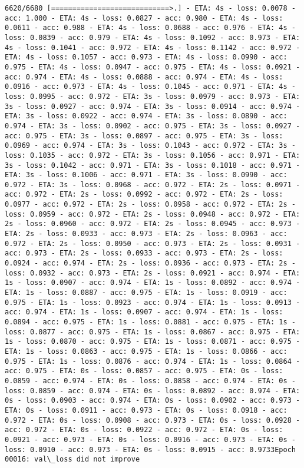 \documentclass[11pt]{article}
\begin{document}
\begin{Verbatim}[commandchars=\\\{\}]
6620/6680 [============================>.] - ETA: 4s - loss: 0.0078 - acc: 1.000 - ETA: 4s - loss: 0.0827 - acc: 0.980 - ETA: 4s - loss: 0.0611 - acc: 0.988 - ETA: 4s - loss: 0.0688 - acc: 0.976 - ETA: 4s - loss: 0.0839 - acc: 0.979 - ETA: 4s - loss: 0.1092 - acc: 0.973 - ETA: 4s - loss: 0.1041 - acc: 0.972 - ETA: 4s - loss: 0.1142 - acc: 0.972 - ETA: 4s - loss: 0.1057 - acc: 0.973 - ETA: 4s - loss: 0.0990 - acc: 0.975 - ETA: 4s - loss: 0.0947 - acc: 0.975 - ETA: 4s - loss: 0.0921 - acc: 0.974 - ETA: 4s - loss: 0.0888 - acc: 0.974 - ETA: 4s - loss: 0.0916 - acc: 0.973 - ETA: 4s - loss: 0.1045 - acc: 0.971 - ETA: 4s - loss: 0.0995 - acc: 0.972 - ETA: 3s - loss: 0.0979 - acc: 0.973 - ETA: 3s - loss: 0.0927 - acc: 0.974 - ETA: 3s - loss: 0.0914 - acc: 0.974 - ETA: 3s - loss: 0.0922 - acc: 0.974 - ETA: 3s - loss: 0.0890 - acc: 0.974 - ETA: 3s - loss: 0.0902 - acc: 0.975 - ETA: 3s - loss: 0.0927 - acc: 0.975 - ETA: 3s - loss: 0.0897 - acc: 0.975 - ETA: 3s - loss: 0.0969 - acc: 0.974 - ETA: 3s - loss: 0.1043 - acc: 0.972 - ETA: 3s - loss: 0.1035 - acc: 0.972 - ETA: 3s - loss: 0.1056 - acc: 0.971 - ETA: 3s - loss: 0.1042 - acc: 0.971 - ETA: 3s - loss: 0.1018 - acc: 0.971 - ETA: 3s - loss: 0.1006 - acc: 0.971 - ETA: 3s - loss: 0.0990 - acc: 0.972 - ETA: 3s - loss: 0.0968 - acc: 0.972 - ETA: 2s - loss: 0.0971 - acc: 0.972 - ETA: 2s - loss: 0.0992 - acc: 0.972 - ETA: 2s - loss: 0.0977 - acc: 0.972 - ETA: 2s - loss: 0.0958 - acc: 0.972 - ETA: 2s - loss: 0.0959 - acc: 0.972 - ETA: 2s - loss: 0.0948 - acc: 0.972 - ETA: 2s - loss: 0.0960 - acc: 0.972 - ETA: 2s - loss: 0.0945 - acc: 0.973 - ETA: 2s - loss: 0.0933 - acc: 0.973 - ETA: 2s - loss: 0.0963 - acc: 0.972 - ETA: 2s - loss: 0.0950 - acc: 0.973 - ETA: 2s - loss: 0.0931 - acc: 0.973 - ETA: 2s - loss: 0.0933 - acc: 0.973 - ETA: 2s - loss: 0.0924 - acc: 0.974 - ETA: 2s - loss: 0.0936 - acc: 0.973 - ETA: 2s - loss: 0.0932 - acc: 0.973 - ETA: 2s - loss: 0.0921 - acc: 0.974 - ETA: 1s - loss: 0.0907 - acc: 0.974 - ETA: 1s - loss: 0.0892 - acc: 0.974 - ETA: 1s - loss: 0.0887 - acc: 0.975 - ETA: 1s - loss: 0.0919 - acc: 0.975 - ETA: 1s - loss: 0.0923 - acc: 0.974 - ETA: 1s - loss: 0.0913 - acc: 0.974 - ETA: 1s - loss: 0.0907 - acc: 0.974 - ETA: 1s - loss: 0.0894 - acc: 0.975 - ETA: 1s - loss: 0.0881 - acc: 0.975 - ETA: 1s - loss: 0.0877 - acc: 0.975 - ETA: 1s - loss: 0.0867 - acc: 0.975 - ETA: 1s - loss: 0.0870 - acc: 0.975 - ETA: 1s - loss: 0.0871 - acc: 0.975 - ETA: 1s - loss: 0.0863 - acc: 0.975 - ETA: 1s - loss: 0.0866 - acc: 0.975 - ETA: 1s - loss: 0.0876 - acc: 0.974 - ETA: 1s - loss: 0.0864 - acc: 0.975 - ETA: 0s - loss: 0.0857 - acc: 0.975 - ETA: 0s - loss: 0.0859 - acc: 0.974 - ETA: 0s - loss: 0.0858 - acc: 0.974 - ETA: 0s - loss: 0.0859 - acc: 0.974 - ETA: 0s - loss: 0.0892 - acc: 0.974 - ETA: 0s - loss: 0.0903 - acc: 0.974 - ETA: 0s - loss: 0.0902 - acc: 0.973 - ETA: 0s - loss: 0.0911 - acc: 0.973 - ETA: 0s - loss: 0.0918 - acc: 0.972 - ETA: 0s - loss: 0.0908 - acc: 0.973 - ETA: 0s - loss: 0.0928 - acc: 0.972 - ETA: 0s - loss: 0.0922 - acc: 0.972 - ETA: 0s - loss: 0.0921 - acc: 0.973 - ETA: 0s - loss: 0.0916 - acc: 0.973 - ETA: 0s - loss: 0.0910 - acc: 0.973 - ETA: 0s - loss: 0.0915 - acc: 0.9733Epoch 00016: val\_loss did not improve

\end{Verbatim}
\end{document}
